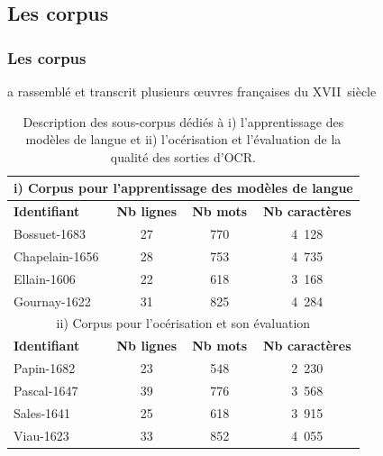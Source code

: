 \documentclass{beamer}
\begin{document}
		\subsection{Les corpus}
		\begin{frame}\frametitle{Les corpus}
		\cite{Gabay2019a} a rassemblé et transcrit plusieurs \oe{}uvres françaises du XVII\ieme~siècle 
		\begin{scriptsize}
		\begin{table}[h]		    
		    \begin{tabular}{|l|c|c|c|}
		    \multicolumn{4}{c}{i) Corpus pour l'apprentissage des modèles de langue}\\\hline
		    \textbf{Identifiant}&\textbf{Nb lignes}&\textbf{Nb mots}&\textbf{Nb caractères}\\\hline
		    Bossuet-1683&27&770&4~128\\ \hline
		    Chapelain-1656&28&753&4~735\\ \hline
		    Ellain-1606&22&618&3~168\\ \hline
		    Gournay-1622&31&825&4~284\\ \hline
		    \multicolumn{4}{c}{ii) Corpus pour l'océrisation et son évaluation}\\\hline
		    \textbf{Identifiant}&\textbf{Nb lignes}&\textbf{Nb mots}&\textbf{Nb caractères}\\\hline
		    Papin-1682&23&548&2~230\\ \hline
		    Pascal-1647&39&776&3~568\\ \hline
		    Sales-1641&25&618&3~915\\ \hline
		    Viau-1623&33&852&4~055\\\hline
		    \end{tabular}
		    \caption{Description des sous-corpus dédiés à i) l'apprentissage des modèles de langue et ii) l'océrisation
		    et l'évaluation de la qualité des sorties d'OCR.} \label{tab:souscorpus}
		\end{table} 
		\end{scriptsize}
		\end{frame}
\end{document}
